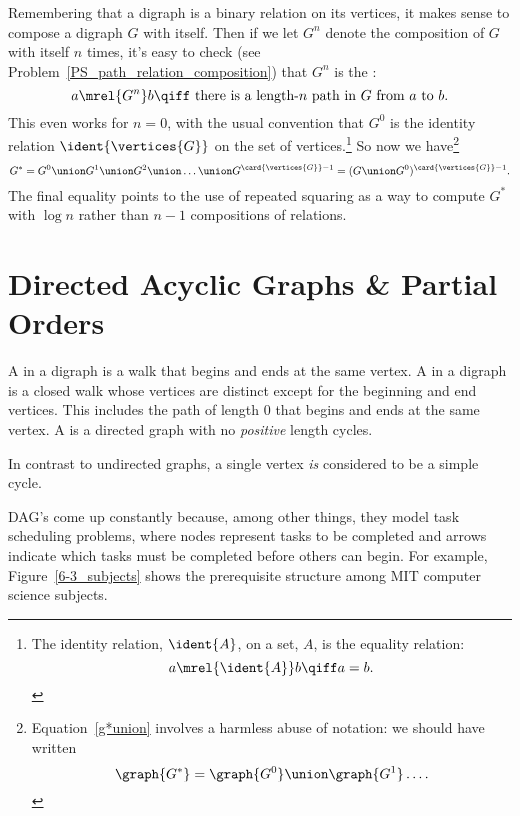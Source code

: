 Remembering that a digraph is a binary relation on its vertices, it
makes sense to compose a digraph $G$ with itself.  Then if we let
$G^n$ denote the composition of $G$ with itself $n$ times, it's easy
to check (see Problem~\ref{PS_path_relation_composition}) that $G^n$
is the :
\[
a  \mrel{G^n} b \qiff \mbox{ there is a length-$n$ path in $G$ from $a$ to $b$}.
\]
This even works for $n=0$, with the usual convention that $G^0$ is the
identity relation $\ident{\vertices{G}}$ on the set of vertices.\footnote{The identity relation, $\ident{A}$, on a set, $A$, is the equality relation:
\[
a \mrel{\ident{A}} b \qiff a  = b.
\]}
So now we have\footnote{Equation~\eqref{g*union} involves a harmless
  abuse of notation: we should have written
\[
\graph{G^*} = \graph{G^0} \union \graph{G^1} \dots.
\]
}
\begin{equation}\label{g*union}
G^* = G^0 \union G^1 \union G^2 \union \dots \union G^{\card{\vertices{G}}-1} = (G \union G^0)^{\card{\vertices{G}}-1}.
\end{equation}
The final equality points to the use of repeated squaring as a way to
compute $G^*$ with $\log n$ rather than $n-1$ compositions of
relations.

\section{Directed Acyclic Graphs \& Partial Orders}\label{dag_sec}

\begin{definition}
A  in a digraph is a walk that begins and ends at
the same vertex.  A  in a digraph is a closed walk whose
vertices are distinct except for the beginning and end vertices.  This
includes the path of length 0 that begins and ends at the same
vertex.  A  is a directed graph
with no \emph{positive} length cycles.
\end{definition}

\begin{staffnotes}

In contrast to undirected graphs, a single vertex \emph{is} considered to
be a simple cycle.

\end{staffnotes}

DAG's come up constantly because, among other things, they model task
scheduling problems, where nodes represent tasks to be completed and
arrows indicate which tasks must be completed before others can begin.
For example, Figure~\ref{6-3_subjects} shows the prerequisite
structure among MIT computer science subjects.

